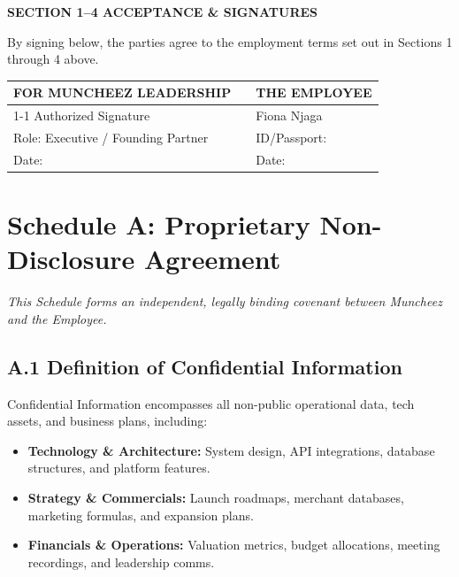 \documentclass[11pt,a4paper]{article}
\begin{document}
\vspace{1.5cm}

\textbf{\textsf{\small SECTION 1--4 ACCEPTANCE \& SIGNATURES}}

By signing below, the parties agree to the employment terms set out in Sections 1 through 4 above.

\vspace{1.0cm}

\begin{tabularx}{\textwidth}{@{}X p{1.2cm} X@{}}
    \textbf{FOR MUNCHEEZ LEADERSHIP} & & \textbf{THE EMPLOYEE} \\[1.0cm]
    \cline{1-1} \cline{3-3}
    \vspace{0.1cm}
    \textsf{\small Authorized Signature} & & \textsf{\small Fiona Njaga} \\
    \textsf{\scriptsize Role: Executive / Founding Partner} & & \textsf{\scriptsize ID/Passport: \underline{\hspace{3.0cm}}} \\
    \textsf{\scriptsize Date: \underline{\hspace{3.0cm}}} & & \textsf{\scriptsize Date: \underline{\hspace{3.0cm}}}
\end{tabularx}

\newpage


\section{Schedule A: Proprietary Non-Disclosure Agreement}

\textit{This Schedule forms an independent, legally binding covenant between Muncheez and the Employee.}

\subsection*{A.1 Definition of Confidential Information}
Confidential Information encompasses all non-public operational data, tech assets, and business plans, including:
\begin{itemize}
    \item \textbf{Technology \& Architecture:} System design, API integrations, database structures, and platform features.
    \item \textbf{Strategy \& Commercials:} Launch roadmaps, merchant databases, marketing formulas, and expansion plans.
    \item \textbf{Financials \& Operations:} Valuation metrics, budget allocations, meeting recordings, and leadership comms.
\end{itemize}
\end{document}
